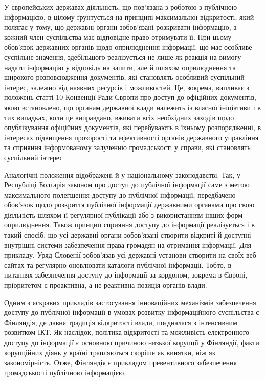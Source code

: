 У європейських державах діяльність, що пов'язана з роботою
з публічною інформацією, в цілому ґрунтується на принципі
максимальної відкритості, який полягає у тому, що державні органи
зобов'язані розкривати інформацію, а кожний член суспільства має
відповідне право отримувати її. При цьому обов'язок державних органів
щодо оприлюднення інформації, що має особливе суспільне значення,
здебільшого реалізується не лише як реакція на вимогу надати
інформацію у відповідь на запити, але й шляхом оприлюднення та
широкого розповсюдження документів, які становлять особливий
суспільний інтерес, залежно від наявних ресурсів і можливостей.
Це, зокрема, випливає з положень статті 10 Конвенції Ради Європи
про доступ до офіційних документів, якою встановлено, що органам
державної влади належить із власної ініціативи і в тих випадках, коли
це виправдано, вживати всіх необхідних заходів щодо опублікування
офіційних документів, які перебувають в їхньому розпорядженні, в
інтересах підвищення прозорості та ефективності органів державного
управління та сприяння інформованому залученню громадськості у
справи, які становлять суспільний інтерес

Аналогічні положення відображені й у національному законодавстві.
Так, у Республіці Болгарія законом про доступ до публічної інформації
саме з метою максимального полегшення доступу
до публічної інформації, передбачено обов'язок щодо
розкриття публічної інформації державними органами про свою
діяльність шляхом її регулярної публікації або з використанням
інших форм оприлюднення.
Також принцип сприяння доступу до
інформації реалізується і в такий спосіб, що усі державні органи
зобов'язані створити відкриті й доступні внутрішні
системи забезпечення права громадян на отримання інформації.
Для прикладу, Уряд Словенії зобов'язав усі державні установи створити на своїх
веб-сайтах та регулярно оновлювати каталоги публічної інформації.
Тобто, в питаннях забезпечення доступу до інформації за кордоном,
зокрема в Європі, пріоритетом є проактивна, а не реактивна позиція
органів влади.

Одним з яскравих прикладів застосування інноваційних механізмів
забезпечення доступу до публічної інформації в умовах розвитку
інформаційного суспільства є Фінляндія, де давня традиція
відкритості влади, поєдналася з інтенсивним розвитком ІКТ. Як
наслідок, політика відкритості та можливість електронного доступу
до інформації є основною причиною низької корупції у Фінляндії,
факти корупційних діянь у країні трапляються скоріше як винятки,
ніж як закономірність. Отже, Фінляндія є прикладом превентивного
забезпечення громадськості публічною інформацією.

